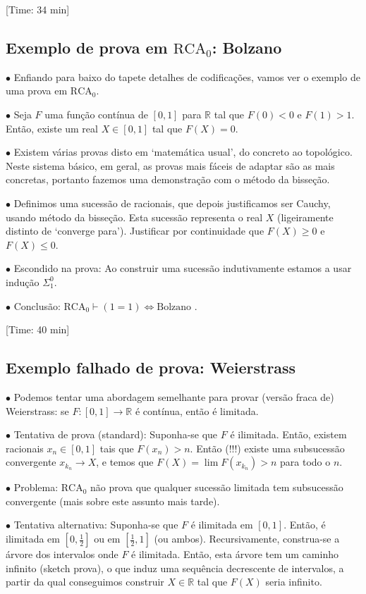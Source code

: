 \documentclass{article}
\theoremstyle{nonumberplain}
\newcommand{\R}{\mathbb{R}}
\newcommand{\RCA}{\mathrm{RCA}}
\newcommand\point[1]{\noindent \hspace{\labelsep} $\bullet$ #1 \smallskip}
\newcommand\timestamp[1]{\noindent \hspace{\labelsep} [Time: #1] \smallskip}
\begin{document}
\timestamp{34 min}

\subsection{Exemplo de prova em $\RCA_0$: Bolzano}

\point{Enfiando para baixo do tapete detalhes de codificações, vamos ver o exemplo de uma prova em $\RCA_0$.}

\point{Seja $F$ uma função contínua de $[0,1]$ para $\R$ tal que $F(0) < 0$ e $F(1) > 1$. Então, existe um real $X \in [0,1]$ tal que $F(X) = 0$.}

\point{Existem várias provas disto em `matemática usual', do concreto ao topológico. Neste sistema básico, em geral, as provas mais fáceis de adaptar são as mais concretas, portanto fazemos uma demonstração com o método da bisseção.}

\point{Definimos uma sucessão de racionais, que depois justificamos ser Cauchy, usando método da bisseção. Esta sucessão representa o real $X$ (ligeiramente distinto de `converge para'). Justificar por continuidade que $F(X) \geq 0$ e $F(X) \leq 0$.}

\point{Escondido na prova: Ao construir uma sucessão indutivamente estamos a usar indução $\Sigma^0_1$.}

\point{Conclusão: $\RCA_0 \vdash (1 = 1) \iff \text{Bolzano}$}.

\timestamp{40 min}

\subsection{Exemplo falhado de prova: Weierstrass}

\point{Podemos tentar uma abordagem semelhante para provar (versão fraca de) Weierstrass: se $F \colon [0,1] \to \R$ é contínua, então é limitada.}

\point{Tentativa de prova (standard): Suponha-se que $F$ é ilimitada. Então, existem racionais $x_n \in [0,1]$ tais que $F(x_n) > n$. Então (!!!) existe uma subsucessão convergente $x_{k_n} \to X$, e temos que $F(X) = \lim F(x_{k_n}) > n$ para todo o $n$.}

\point{Problema: $\RCA_0$ não prova que qualquer sucessão limitada tem subsucessão convergente (mais sobre este assunto mais tarde).}

\point{Tentativa alternativa: Suponha-se que $F$ é ilimitada em $[0,1]$. Então, é ilimitada em $[0,\frac12]$ ou em $[\frac12,1]$ (ou ambos). Recursivamente, construa-se a árvore dos intervalos onde $F$ é ilimitada. Então, esta árvore tem um caminho infinito (sketch prova), o que induz uma sequência decrescente de intervalos, a partir da qual conseguimos construir $X \in \R$ tal que $F(X)$ seria infinito.}
\end{document}
